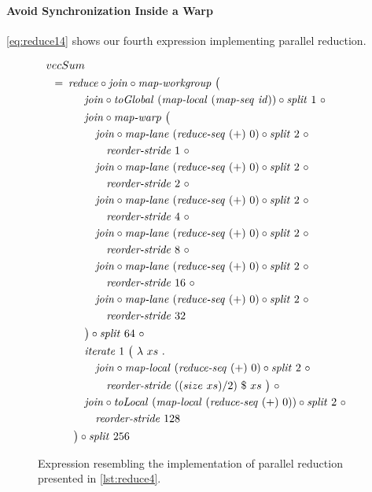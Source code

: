 \paragraph{Avoid Synchronization Inside a Warp}
\autoref{eq:reduce14} shows our fourth expression implementing parallel reduction.
\begin{figure}
  \begin{align*}
    &\hspace{-1.5em}vecSum\\
    &\hspace{-2em}\quad\begin{aligned}
      &=\hspace{.2em}
        \reduce \circ \join \circ \mapWorkgroup\ \big(\\
      &\qquad\quad \join \circ \toGlobal\ (\mapLocal\ (\mapSeq\ \id)) \circ \splitN\ 1\ \circ\\
      &\qquad\quad \join \circ \mapWarp\ \big(\\
      &\qquad\qquad \join \circ \mapLane\ (\reduceSeq\ (+)\ 0) \circ \splitN\ 2\ \circ\\
      &\qquad\qquad\quad \reorderStride\ 1\ \circ\\
      &\qquad\qquad \join \circ \mapLane\ (\reduceSeq\ (+)\ 0) \circ \splitN\ 2\ \circ\\
      &\qquad\qquad\quad \reorderStride\ 2\ \circ\\
      &\qquad\qquad \join \circ \mapLane\ (\reduceSeq\ (+)\ 0) \circ \splitN\ 2\ \circ\\
      &\qquad\qquad\quad \reorderStride\ 4\ \circ\\
      &\qquad\qquad \join \circ \mapLane\ (\reduceSeq\ (+)\ 0) \circ \splitN\ 2\ \circ\\
      &\qquad\qquad\quad \reorderStride\ 8\ \circ\\
      &\qquad\qquad \join \circ \mapLane\ (\reduceSeq\ (+)\ 0) \circ \splitN\ 2\ \circ\\
      &\qquad\qquad\quad \reorderStride\ 16\ \circ\\
      &\qquad\qquad \join \circ \mapLane\ (\reduceSeq\ (+)\ 0) \circ \splitN\ 2\ \circ\\
      &\qquad\qquad\quad \reorderStride\ 32\\
      &\qquad\quad\big) \circ \splitN\ 64\ \circ\\
      &\qquad\quad \iterateN\ 1\ \big(\ \lambda\ xs\ .\\
      &\qquad\qquad \join \circ \mapLocal\ (\reduceSeq\ (+)\ 0) \circ \splitN\ 2\ \circ\\
      &\qquad\qquad\quad \reorderStride\ ((size\ xs)/2)\ \$\ xs\ \big)\ \circ\\
      &\qquad\quad \join \circ \toLocal\ (\mapLocal\ (\reduceSeq\ (+)\ 0)) \circ \splitN\ 2\ \circ\\
      &\qquad\qquad \reorderStride\ 128\\
      &\qquad\big) \circ \splitN\ 256
    \end{aligned}
  \end{align*}
  \caption{Expression resembling the implementation of parallel reduction presented in \autoref{lst:reduce4}.}
  \label{eq:reduce14}
\end{figure}

